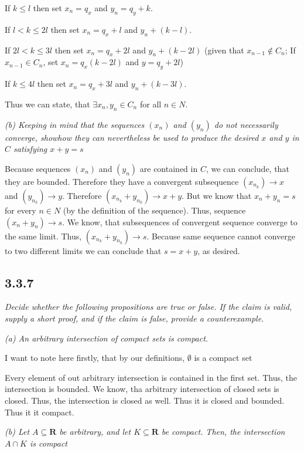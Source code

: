 \documentclass[11pt,oneside,titlepage]{book}
\begin{document}
If $k \leq l$ then set $x_n = q_x$ and $y_n = q_y + k$.

If $l < k \leq 2l$ then set $x_n = q_x + l$ and $y_n + (k - l)$.

If $2l < k \leq 3l$ then set $x_n = q_x + 2l$ and $y_n + (k - 2l)$ (given that
$x_{n - 1} \notin C_n$; If $x_{n - 1} \in C_n$, set $x_n = q_x (k - 2l)$
and $y = q_y + 2l$)

If $k \leq 4l$ then set $x_n = q_x + 3l$ and $y_n + (k - 3l)$.

Thus we can state, that $\exists x_n, y_n \in C_n$ for all $n \in N$.

\textit{(b) Keeping in mind that the sequences $(x_n)$ and $(y_n)$ do not
  necessarily converge, showhow they can nevertheless be used to produce the
  desired $x$ and $y$ in $C$ satisfying $x + y = s$}

Because sequences $(x_n)$ and $(y_n)$ are contained in $C$, we can conclude,
that they are bounded. Therefore they have a convergent subsequence
$(x_{n_k}) \to x$ and $(y_{n_k}) \to y$.
Therefore $(x_{n_k} + y_{n_k}) \to x + y$.
But we know that  $x_n + y_n = s$ for every
$n \in N$ (by the definition of the sequence). Thus, sequence
$(x_n + y_n) \to s$. We know, that subsequences of convergent sequence converge
to the same limit. Thus, $(x_{n_k} + y_{n_k}) \to s$. Because same sequence
cannot converge to two different limits we can conclude that $s = x + y$,
as desired.

\subsection*{3.3.7}
\textit{Decide whether the following propositions are true or false. If the claim is valid, supply a short proof, and if the claim is false, provide a counterexample.}

\textit{(a) An arbitrary intersection of compact sets is compact.}

I want to note here firstly, that by our definitions, $\emptyset$ is a
compact set

Every element of out arbitrary intersection is contained in the first set.
Thus, the intersection is bounded. We know, tha arbitrary intersection of
closed sets is closed. Thus, the intersection is closed as well. Thus it
is closed and bounded. Thus it it compact.

\textit{(b) Let $A \subseteq \textbf{R}$ be arbitrary, and let
  $K \subseteq \textbf{R}$ be compact. Then, the intersection $A \cap K$ is
  compact}
\end{document}
